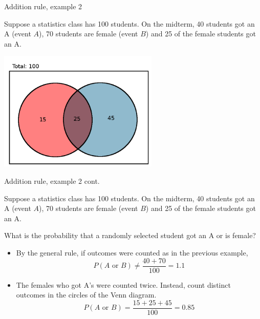 \documentclass[xcolor=table]{beamer}
\begin{document}
\begin{frame}{Addition rule, example 2}
\begin{block}{}
Suppose a statistics class has 100 students. On the midterm, 40 students got an A (event $A$),  70 students are female (event $B$) and 25 of the female students got an A.
\end{block}

{\centering
\includegraphics[width=3in]{../images/ch4_venn_ovr_ex}\par
}
\end{frame}

\begin{frame}{Addition rule, example 2 cont.}
\begin{block}{}
Suppose a statistics class has 100 students. On the midterm, 40 students got an A (event $A$),  70 students are female (event $B$) and 25 of the female students got an A.
\end{block}
\begin{exampleblock}{}
What is the probability that a randomly selected student got an A or is female?
\begin{itemize}
\pause
\item By the general rule, if outcomes were counted as in the previous example,
\[P(A \text{ or } B) \ne \frac {40 + 70}{100} = 1.1\]

\pause
\item The females who got A's were counted twice. Instead, count distinct outcomes in the circles of the Venn diagram.
\[P(A \text{ or } B) = \frac {15 + 25 + 45}{100} = 0.85\]

\end{itemize}
\end{exampleblock}

\end{frame}
\end{document}
